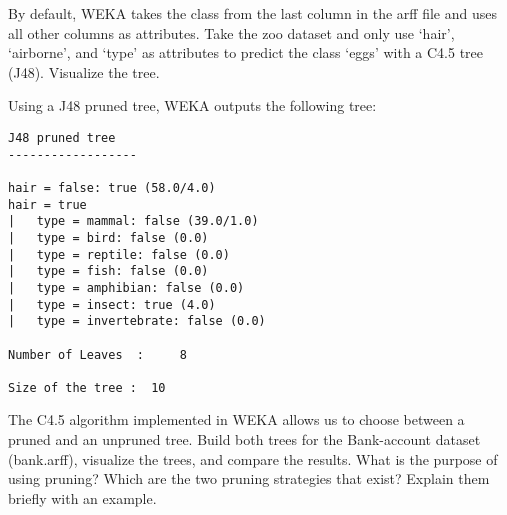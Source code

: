 \documentclass[fontsize=12pt, usenames, dvipsnames, headinclude, headsepline, footinclude, footsepline]{scrartcl}
\title{\normalfont{\bfseries{Machine Learning: Homework 4}}}
\author{Laurent \textsc{Hayez}}
\date{\today}
\begin{document}
\renewcommand{\labelitemi}{\textbullet}



\maketitle




\begin{exo}
  By default, WEKA takes the class from the last column in the arff file and uses all other columns as
  attributes. Take the zoo dataset and only use ‘hair’, ‘airborne’, and ‘type’ as attributes to predict the
  class ‘eggs’ with a C4.5 tree (J48). Visualize the tree.
\end{exo}

  \begin{sol}
    Using a J48 pruned tree, WEKA outputs the following tree:
\begin{verbatim}
J48 pruned tree
------------------

hair = false: true (58.0/4.0)
hair = true
|   type = mammal: false (39.0/1.0)
|   type = bird: false (0.0)
|   type = reptile: false (0.0)
|   type = fish: false (0.0)
|   type = amphibian: false (0.0)
|   type = insect: true (4.0)
|   type = invertebrate: false (0.0)

Number of Leaves  : 	8

Size of the tree : 	10
\end{verbatim}
  \end{sol}


\begin{exo}
  The C4.5 algorithm implemented in WEKA allows us to choose between a pruned and an unpruned tree. Build both
  trees for the Bank-account dataset (bank.arff), visualize the trees, and compare the results. What is the
  purpose of using pruning? Which are the two pruning strategies that exist? Explain them briefly with an
  example.
\end{exo}
\end{document}
